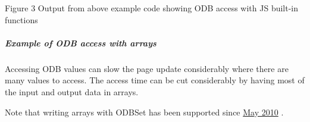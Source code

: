 \par
\par
\par
 \begin{center} Figure 3 Output from above example code showing ODB access with JS built-\/in functions \par
\par
\par
  \par
\par
\par
 \end{center} \hypertarget{RC_mhttpd_custom_ODB_access_examples_RC_mhttpd_js_example3}{}\subparagraph{Example of ODB access with arrays}\label{RC_mhttpd_custom_ODB_access_examples_RC_mhttpd_js_example3}
Accessing ODB values can slow the page update considerably where there are many values to access. The access time can be cut considerably by having most of the input and output data in arrays.

 Note that writing arrays with ODBSet has been supported since \hyperlink{NDF_ndf_may_2010}{May 2010} . 

